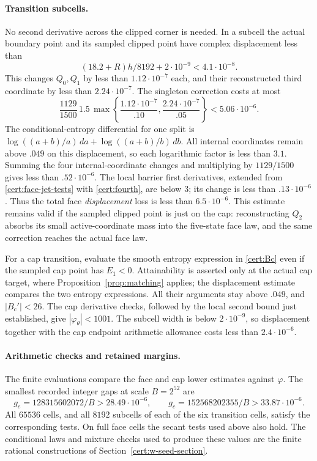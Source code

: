\paragraph{Transition subcells.}
No second derivative across the clipped corner is needed.  In a subcell
the actual boundary point and its sampled clipped point have complex
displacement less than
\[
 (18.2+R)h/8192+2\cdot10^{-9}<4.1\cdot10^{-8}.
\]
This changes $Q_0,Q_1$ by less than $1.12\cdot10^{-7}$ each, and their
reconstructed third coordinate by less than $2.24\cdot10^{-7}$.
The singleton correction costs at most
\[
 \frac{1129}{1500}\,1.5\,
       \max\left\{\frac{1.12\cdot10^{-7}}{.10},
                    \frac{2.24\cdot10^{-7}}{.05}\right\}
       <5.06\cdot10^{-6}.
\]
The conditional-entropy differential for one split is
$\log((a+b)/a)\,da+\log((a+b)/b)\,db$.  All internal coordinates
remain above $.049$ on this displacement, so each logarithmic factor
is less than $3.1$.  Summing the four internal-coordinate changes
and multiplying by $1129/1500$ gives less than $.52\cdot10^{-6}$.
The local barrier first derivatives, extended from
\eqref{cert:face-jet-tests} with \eqref{cert:fourth}, are below 3;
its change is less than $.13\cdot10^{-6}$.  Thus the total face
\emph{displacement} loss is less than $6.5\cdot10^{-6}$.
This estimate remains valid if the sampled clipped point is just on the
cap: reconstructing $Q_2$ absorbs its small active-coordinate mass into
the five-state face law, and the same correction reaches the actual
face law.

For a cap transition, evaluate the smooth entropy expression in
\eqref{cert:Bc} even if the sampled cap point has $E_1<0$.  Attainability
is asserted only at the actual cap target, where Proposition~\ref{prop:matching}
applies; the displacement estimate compares the two entropy expressions.
All their arguments stay above $.049$, and $|B_c'|<26$.  The cap derivative checks, followed by the local second
bound just established, give $|\varphi_\theta|<1001$.  The subcell
width is below $2\cdot10^{-9}$, so displacement together with the cap
endpoint arithmetic allowance costs less than $2.4\cdot10^{-6}$.

\paragraph{Arithmetic checks and retained margins.}
The finite evaluations compare the face and cap lower estimates against
$\varphi$.  The smallest recorded integer gaps at scale $B=2^{52}$ are
\begin{equation}\label{cert:actual-gaps}
 g_e=128315602072/B>28.49\cdot10^{-6},\qquad
 g_c=152568202355/B>33.87\cdot10^{-6}.
\end{equation}
All $65536$ cells, and all $8192$ subcells of each of the six transition
cells, satisfy the corresponding tests.  On full face cells the secant
tests used above also hold.  The conditional laws and mixture checks
used to produce these values are the finite rational constructions of
Section~\ref{cert:w-seed-section}.


